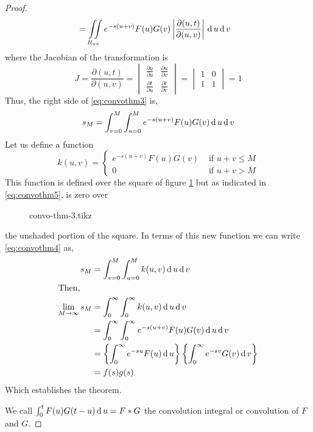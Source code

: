 \documentclass[12pt,class=book,crop=false]{standalone}
\begin{document}
\begin{proof}
\begin{align}
            & =\iint\limits_{R_{uv}} e^{-s(u+v)}F(u)G(v)\left\vert\frac{\partial (u,t)}{\partial (u,v)}\right\vert\,\mathrm{d}\, u\,\mathrm{d}\, v\label{eq:convothm3}
    \end{align}
    where the Jacobian of the transformation is
    \[
        J=\frac{\partial (u,t)}{\partial (u,v)}=\begin{vmatrix}
            \frac{\partial u}{\partial u} & \frac{\partial u}{\partial v} \\
            \frac{\partial t}{\partial u} & \frac{\partial t}{\partial v}
        \end{vmatrix}=\begin{vmatrix}
            1 & 0 \\
            1 & 1
        \end{vmatrix}=1
    \]
    Thus, the right side of \eqref{eq:convothm3} is,
    \begin{equation}
        s_M=\int_{v=0}^M\int_{u=0}^M e^{-s(u+v)}F(u)G(v)\,\mathrm{d}\, u\,\mathrm{d}\, v \label{eq:convothm4}
    \end{equation}
    Let us define a function
    \begin{equation}
        \label{eq:convothm5}
        k(u,v)=\begin{cases}
            e^{-s(u+v)}F(u)G(v) & \text{ if } u+v\leq M \\
            0                   & \text{ if } u+v> M
        \end{cases}
    \end{equation}
    This function is defined over the square of figure \ref{fig:convothm3} but as indicated in \eqref{eq:convothm5}, is zero over
    \begin{figure}[H]
        \centering
        {convo-thm-3.tikz}
        \caption{}
        \label{fig:convothm3}
    \end{figure}
    the unshaded portion of the square. In terms of this new function we can write \eqref{eq:convothm4} as,
    \begin{align*}
        s_M                    & =\int_{v=0}^M\int_{u=0}^M k(u,v)\,\mathrm{d}\, u\,\mathrm{d}\, v                                                           \\
        \intertext{Then,}
        \lim_{M\to \infty} s_M & =\int_{0}^\infty \int_{0}^\infty k(u,v)\,\mathrm{d}\, u\,\mathrm{d}\, v                                                    \\
                               & =\int_{0}^\infty \int_{0}^\infty e^{-s(u+v)}F(u)G(v) \,\mathrm{d}\, u\,\mathrm{d}\, v                                      \\
                               & =\left\{ \int_{0}^\infty e^{-su}F(u)\,\mathrm{d}\, u \right\}\left\{ \int_{0}^\infty e^{-sv}G(v) \,\mathrm{d}\, v \right\} \\
                               & =f(s) g(s)
    \end{align*}
    Which establishes the theorem.

    We call $ \int_0^t F(u)G(t-u)\,\mathrm{d}\, u=F*G $ the convolution integral or convolution of $ F $ and $ G $.
\end{proof}
\end{document}
